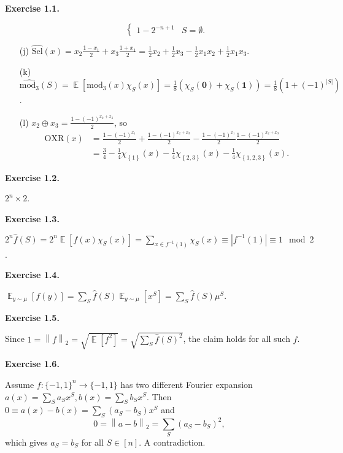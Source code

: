 \documentclass[a4paper]{article}
\newenvironment{exercise}[1]{
	\par
	\noindent\textbf{Exercise #1.}\quad
}{
	\par
	\bigskip
}
\DeclareMathOperator{\E}{\mathbb E}
\newcommand{\abs}[1]{{\left| #1 \right|}}
\newcommand{\vabs}[1]{{\left\| #1 \right\|}}
\newcommand{\pbra}[1]{{\left( #1 \right)}}
\newcommand{\cbra}[1]{{\left\{ #1 \right\}}}
\newcommand{\sbra}[1]{{\left[ #1 \right]}}
\newcommand{\pmbin}{{\{-1,1\}}}
\begin{document}
\begin{exercise}{1.1}
\begin{itemize}
$$\begin{cases}
                1-2^{-n+1}&S=\emptyset.
            \end{cases}
            $$
        \item[(j)] $\widehat{\text{Sel}}(x)=x_2\frac{1-x_1}2+x_3\frac{1+x_1}2=\frac12x_2+\frac12x_3-\frac12x_1x_2+\frac12x_1x_3$.
        \item[(k)] $\widehat{\text{mod}_3}(S)=\E\sbra{\text{mod}_3(x)\chi_S(x)}=\frac18\pbra{\chi_S(\bm0)+\chi_S(\bm1)}
            =\frac18\pbra{1+(-1)^{|S|}}$.
        \item[(l)] $x_2\oplus x_3=\frac{1-(-1)^{x_2+x_3}}2$, so 
            \begin{align*}
            \text{OXR}(x)
                &=\frac{1-(-1)^{x_1}}2+\frac{1-(-1)^{x_2+x_3}}2-\frac{1-(-1)^{x_1}}2\frac{1-(-1)^{x_2+x_3}}2\\
                &=\frac34-\frac14\chi_\cbra{1}(x)-\frac14\chi_\cbra{2,3}(x)-\frac14\chi_\cbra{1,2,3}(x).
            \end{align*}
    \end{itemize}
\end{exercise}

\begin{exercise}{1.2}
    $2^n\times 2$.
\end{exercise}

\begin{exercise}{1.3} 
    $2^n\widehat f(S)=2^n\E\sbra{f(x)\chi_S(x)}=\sum_{x\in f^{-1}(1)}\chi_S(x)\equiv\abs{f^{-1}(1)}\equiv1\mod2$.
\end{exercise}

\begin{exercise}{1.4}
    $\E_{y\sim\mu}\sbra{f(y)}=\sum_S\widehat f(S)\E_{y\sim\mu}\sbra{x^S}=\sum_S\widehat f(S)\mu^S$.
\end{exercise}

\begin{exercise}{1.5}
    Since $1=\vabs{f}_2=\sqrt{\E\sbra{f^2}}=\sqrt{\sum_S\widehat{f}(S)^2}$, the claim holds for all such $f$.
\end{exercise}

\begin{exercise}{1.6}
    Assume $f:\pmbin^n\to\pmbin$ has two different Fourier expansion $a(x)=\sum_Sa_Sx^S,b(x)=\sum_Sb_Sx^S$.
    Then $0\equiv a(x)-b(x)=\sum_S(a_S-b_S)x^S$ and 
    $$
    0=\vabs{a-b}_2=\sum_S(a_S-b_S)^2,
    $$
    which gives $a_S=b_S$ for all $S\in[n]$. A contradiction.
\end{exercise}
\end{document}
